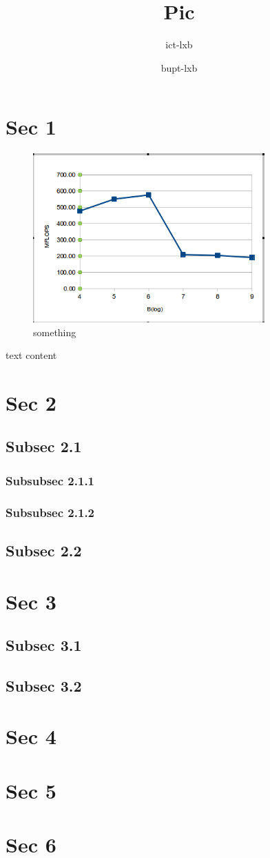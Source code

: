 \documentclass[a4paper, 11pt]{article}
\title{Pic}
\author{ict-lxb \and bupt-lxb}
\begin{document}
\maketitle

\section{Sec 1}

\begin{figure}[htbp]
    \centering\includegraphics[width=3.5in]{figures/b_mflops.png}
\caption{something}\label{fig:1}
\end{figure}

text content
\newpage
\section{Sec 2}
\subsection{Subsec 2.1}
\newpage
\subsubsection{Subsubsec 2.1.1}
\newpage
\subsubsection{Subsubsec 2.1.2}
\newpage
\subsection{Subsec 2.2}
\newpage
\section{Sec 3}
\subsection{Subsec 3.1}
\subsection{Subsec 3.2}
\newpage
\section{Sec 4}
\newpage
\section{Sec 5}
\newpage
\section{Sec 6}
\newpage
\end{document}
